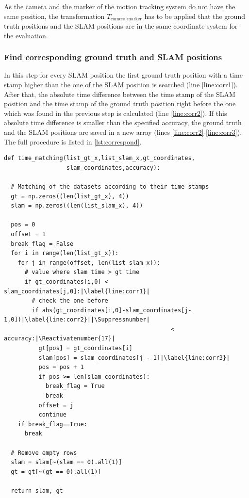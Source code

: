 As the camera and the marker of the motion tracking system do not have the same position, the transformation $T_{\text{camera\_marker}}$ has to be applied that the ground truth positions and the \ac{SLAM} positions are in the same coordinate system for the evaluation.

\subsubsection{Find corresponding ground truth and \ac{SLAM} positions}
In this step for every \ac{SLAM} position the first ground truth position with a time stamp higher than the one of the \ac{SLAM} position is searched (line \autoref{line:corr1}). After that, the absolute time difference between the time stamp of the \ac{SLAM} position and the time stamp of the ground truth position right before the one which was found in the previous step is calculated (line \autoref{line:corr2}). If this absolute time difference is smaller than the specified accuracy, the ground truth and the \ac{SLAM} positions are saved in a new array (lines \autoref{line:corr2}-\autoref{line:corr3}). The full procedure is listed in \autoref{lst:correspond}.

\lstset{language=Python}
\begin{lstlisting}[frame=single, caption=Find corresponding positions in time, label=lst:correspond]
def time_matching(list_gt_x,list_slam_x,gt_coordinates,
                  slam_coordinates,accuracy):

  # Matching of the datasets according to their time stamps
  gt = np.zeros((len(list_gt_x), 4))
  slam = np.zeros((len(list_slam_x), 4))

  pos = 0
  offset = 1
  break_flag = False
  for i in range(len(list_gt_x)):
    for j in range(offset, len(list_slam_x)):
      # value where slam time > gt time
      if gt_coordinates[i,0] < slam_coordinates[j,0]:|\label{line:corr1}|
        # check the one before
        if abs(gt_coordinates[i,0]-slam_coordinates[j-1,0])|\label{line:corr2}||\Suppressnumber|
                                                < accuracy:|\Reactivatenumber{17}|
          gt[pos] = gt_coordinates[i]
          slam[pos] = slam_coordinates[j - 1]|\label{line:corr3}|
          pos = pos + 1
          if pos >= len(slam_coordinates):
            break_flag = True
            break
          offset = j
          continue
    if break_flag==True:
      break

  # Remove empty rows
  slam = slam[~(slam == 0).all(1)]
  gt = gt[~(gt == 0).all(1)]

  return slam, gt
\end{lstlisting}

